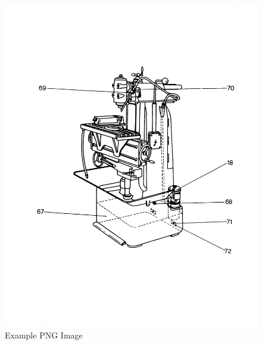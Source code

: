 \newpage
\begin{figure}[h]
    \centering
    \includegraphics[width=1.0\linewidth]{images/page_29}
    \caption{Example PNG Image}
    \label{fig:cooling_system}
\end{figure}
